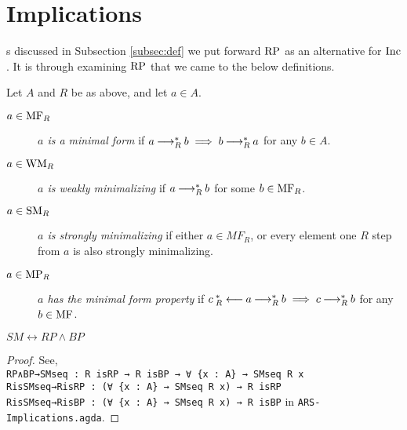 \section{Implications}
\label{sec:Implications}

\newenvironment{counterexample}[1][]{%
    \refstepcounter{CEcounter} %
    \noindent \scriptsize\textbf{{\theCEcounter } }  #1\par
}

As discussed in Subsection \ref{subsec:def} we put forward $\mathrm{RP}$ as an alternative for $\mathrm{Inc}$. It is through examining $\mathrm{RP}$ that 
we came to the below definitions. 

\begin{definition}\label{def:mf}  Let $A$ and $R$ be as above, and let $a \in A$.
    \begin{description}
        \item[$a \in \mathrm{MF}_R$] \emph{$a$ is a minimal form} if $a \mathbin{\longrightarrow_R^*} b \implies b \mathbin{\longrightarrow_R^*} a$ for any $b \in A$.
        \item[$a \in \mathrm{WM}_R$] \emph{$a$ is weakly minimalizing} if $a \mathbin{\longrightarrow_R^*} b$ for some $b \in \mathrm{MF}_R$.
        \item[$a \in \mathrm{SM}_R$]  \emph{$a$ is strongly minimalizing} if either $a \in MF_R$, or every element one $R$ step from $a$ is also strongly minimalizing.
        \item[$a \in \mathrm{MP}_R$] \emph{$a$ has the minimal form property} if $c \mathbin{_R^*\longleftarrow} a \mathbin{\longrightarrow_R^*} b \implies c \mathbin{\longrightarrow_R^*} b$ for any $b \in \mathrm{MF}$.

    \end{description} 
\end{definition}

\begin{proposition}\label{prop:SMRP}
    $SM \leftrightarrow RP \land BP$
\end{proposition}
\begin{proof}
    See,\\ \verb|RP∧BP→SMseq : R isRP → R isBP → ∀ {x : A} → SMseq R x| \\ \verb|RisSMseq→RisRP : (∀ {x : A} → SMseq R x) → R isRP|
    \\ \verb|RisSMseq→RisBP : (∀ {x : A} → SMseq R x) → R isBP| in \texttt{ARS-Implications.agda}.
\end{proof}

